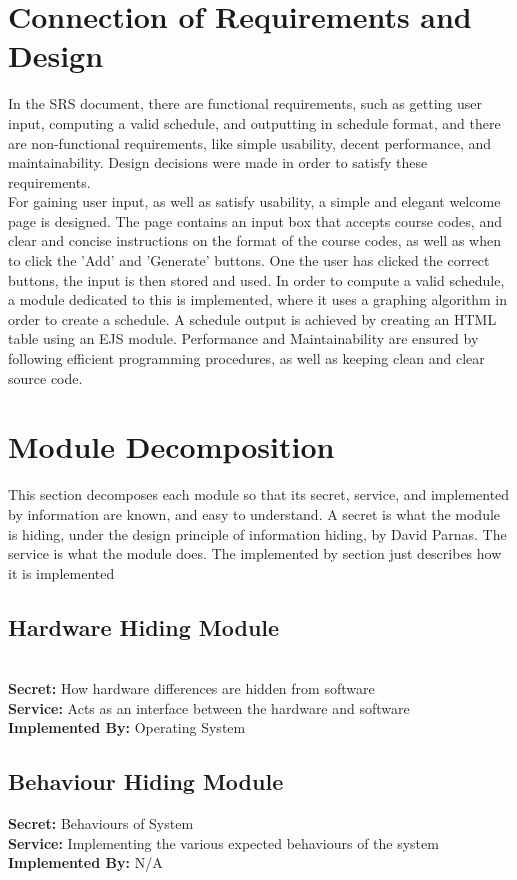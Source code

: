 \documentclass[11pt, oneside]{article}
\begin{document}
\section{Connection of Requirements and Design}
\tab In the SRS document, there are functional requirements, such as getting user input, computing a valid schedule, and outputting in schedule format, and there are non-functional requirements, like simple usability, decent performance, and maintainability. Design decisions were made in order to satisfy these requirements. \\
\tab For gaining user input, as well as satisfy usability, a simple and elegant welcome page is designed. The page contains an input box that accepts course codes, and clear and concise instructions on the format of the course codes, as well as when to click the 'Add' and 'Generate' buttons. One the user has clicked the correct buttons, the input is then stored and used. In order to compute a valid schedule, a module dedicated to this is implemented, where it uses a graphing algorithm in order to create a schedule. A schedule output is achieved by creating an HTML table using an EJS module. Performance and Maintainability are ensured by following efficient programming procedures, as well as keeping clean and clear source code.

\newpage
\section{Module Decomposition}
\tab This section decomposes each module so that its secret, service, and implemented by information are known, and easy to understand. A secret is what the module is hiding, under the design principle of information hiding, by David Parnas. \cite{1} The service is what the module does. The implemented by section just describes how it is implemented

\subsection{Hardware Hiding Module} \\
\textbf{Secret:} How hardware differences are hidden from software \\
\textbf{Service:} Acts as an interface between the hardware and software \\
\textbf{Implemented By:} Operating System \\

\subsection{Behaviour Hiding Module}
\textbf{Secret:} Behaviours of System \\
\textbf{Service:} Implementing the various expected behaviours of the system \\
\textbf{Implemented By:} N/A \\
\end{document}
